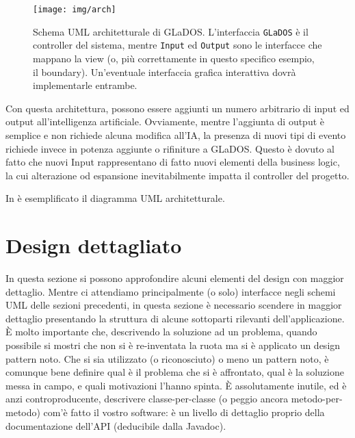 \documentclass[a4paper,12pt]{report}
\begin{document}
\begin{figure}[h]
\centering{}
\texttt{[image: img/arch]}
\caption{Schema UML architetturale di GLaDOS. L'interfaccia \texttt{GLaDOS} è il controller del sistema, mentre \texttt{Input} ed \texttt{Output} sono le interfacce che mappano la view (o, più correttamente in questo specifico esempio, il boundary). Un'eventuale interfaccia grafica interattiva dovrà implementarle entrambe.}
\label{img:goodarch}
\end{figure}

Con questa architettura, possono essere aggiunti un numero arbitrario di input ed output
all'intelligenza artificiale.
%
Ovviamente, mentre l'aggiunta di output è semplice e non richiede alcuna modifica all'IA, la
presenza di nuovi tipi di evento richiede invece in potenza aggiunte o rifiniture a GLaDOS.
%
Questo è dovuto al fatto che nuovi Input rappresentano di fatto nuovi elementi della business
logic, la cui alterazione od espansione inevitabilmente impatta il controller del progetto.

In  è esemplificato il diagramma UML architetturale.


\section{Design dettagliato}

In questa sezione si possono approfondire alcuni elementi del design con maggior dettaglio.
%
Mentre ci attendiamo principalmente (o solo) interfacce negli schemi UML delle sezioni precedenti,
in questa sezione è necessario scendere in maggior dettaglio presentando la struttura di alcune sottoparti rilevanti dell'applicazione.
%
È molto importante che, descrivendo la soluzione ad un problema, quando possibile si mostri che non si è re-inventata la ruota ma si è applicato un design pattern noto.
%
Che si sia utilizzato (o riconosciuto) o meno un pattern noto, è comunque bene definire qual è il problema che si è affrontato, qual è la soluzione messa in campo, e quali motivazioni l'hanno spinta.
%
È assolutamente inutile, ed è anzi controproducente, descrivere classe-per-classe (o peggio ancora metodo-per-metodo) com'è fatto il vostro software: è un livello di dettaglio proprio della documentazione dell'API (deducibile dalla Javadoc).
\end{document}
